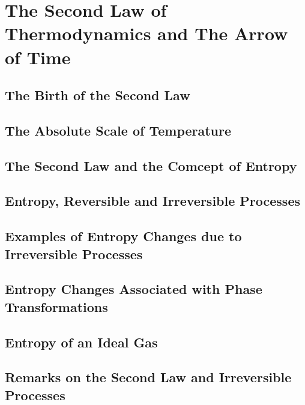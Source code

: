 \chapter{The Second Law of Thermodynamics and The Arrow of Time}
\section{The Birth of the Second Law}
\section{The Absolute Scale of Temperature}
\section{The Second Law and the Comcept of Entropy}
\section{Entropy, Reversible and Irreversible Processes}
\section{Examples of Entropy Changes due to Irreversible Processes}
\section{Entropy Changes Associated with Phase Transformations}
\section{Entropy of an Ideal Gas}
\section{Remarks on the Second Law and Irreversible Processes}